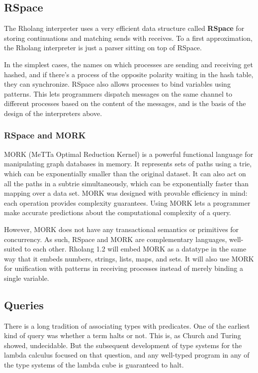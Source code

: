 \documentclass{article}
\begin{document}
\subsection{RSpace}

The Rholang interpreter uses a very efficient data structure called \textbf{RSpace} for storing continuations and matching sends with receives.  To a first approximation, the Rholang interpreter is just a parser sitting on top of RSpace.

In the simplest cases, the names on which processes are sending and receiving get hashed, and if there's a process of the opposite polarity waiting in the hash table, they can synchronize.  RSpace also allows processes to bind variables using patterns.  This lets programmers dispatch messages on the same channel to different processes based on the content of the messages, and is the basis of the design of the interpreters above.

\subsubsection{RSpace and MORK}

MORK (MeTTa Optimal Reduction Kernel) is a powerful functional language for manipulating graph databases in memory. It represents sets of paths using a trie, which can be exponentially smaller than the original dataset.  It can also act on all the paths in a subtrie simultaneously, which can be exponentially faster than mapping over a data set.  MORK was designed with provable efficiency in mind: each operation provides complexity guarantees.  Using MORK lets a programmer make accurate predictions about the computational complexity of a query.

However, MORK does not have any transactional semantics or primitives for concurrency.  As such, RSpace and MORK are complementary languages, well-suited to each other.  Rholang 1.2 will embed MORK as a datatype in the same way that it embeds numbers, strings, lists, maps, and sets.  It will also use MORK for unification with patterns in receiving processes instead of merely binding a single variable.

\subsection{Queries}
\label{Queries}

There is a long tradition of associating types with predicates.  One of the earliest kind of query was whether a term halts or not.  This is, as Church and Turing showed, undecidable.  But the subsequent development of type systems for the lambda calculus focused on that question, and any well-typed program in any of the type systems of the lambda cube is guaranteed to halt.
\end{document}
